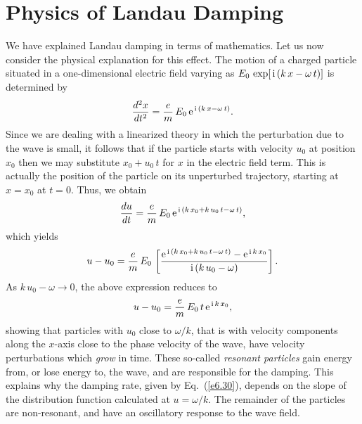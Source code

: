 \section{Physics of Landau Damping}\label{s6.3}
We  have explained Landau damping in terms of mathematics.
Let us now consider the physical explanation for this effect. The motion of a
charged particle situated  in a one-dimensional electric field varying as $E_0\,\exp[\,{\rm i}\,
(k\,x-\omega\,t)]$ is determined by
\begin{equation}
\frac{d^2x}{dt^2} = \frac{e}{m}\,E_0\,{\rm e}^{\,{\rm i}\,
(k\,x-\omega\,t)}.
\end{equation}
Since we are dealing with a linearized theory in which the
perturbation due to the wave is small, it follows that if the particle
starts with velocity $u_0$ at position $x_0$ then we may substitute
$x_0+u_0\,t$ for $x$ in the electric field term. This is actually the position of
the particle on its unperturbed trajectory, starting at $x=x_0$ at $t=0$.
Thus, we obtain 
\begin{equation}
\frac{du}{dt} = \frac{e}{m}\,E_0\,{\rm e}^{\,{\rm i}\,(k\,x_0+k\,u_0\,t-\omega\,t)},
\end{equation}
which yields
\begin{equation}
u-u_0 = \frac{e}{m}\,E_0\,\left[\frac{{\rm e}^{\,{\rm i}\,(k\,x_0+k\,u_0\,t-\omega\,t)}
- {\rm e}^{\,{\rm i}\,k\,x_0}}{{\rm i}\,(k\,u_0-\omega)}\right].
\end{equation}
As $k\,u_0-\omega\rightarrow 0$, the above expression reduces to
\begin{equation}
u -u_0 = \frac{e}{m}\,E_0\,t\,{\rm e}^{\,{\rm i}\,k\,x_0},
\end{equation}
showing that particles with $u_0$ close to $\omega/k$, that is with velocity
components along the $x$-axis close to the phase velocity of the wave, have
velocity perturbations which {\em grow}\/ in time. These so-called {\em resonant particles}\/ 
gain energy from, or lose energy to, the wave, and are responsible for the
damping. This explains why the damping rate, given by Eq.~(\ref{e6.30}), depends on the
slope of the distribution function calculated at $u=\omega/k$. The remainder of the
particles are non-resonant, and have an oscillatory response to the
wave field.

